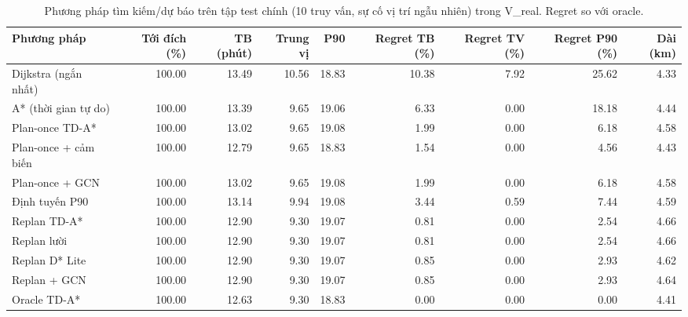 \begin{table}[!htbp]
\centering
\small
\caption{Phương pháp tìm kiếm/dự báo trên tập test chính (10 truy vấn, sự cố vị trí ngẫu nhiên) trong V\_real. Regret so với oracle.}
\label{tab:tab_main_classic}
\begin{adjustbox}{max width=\linewidth}
\begin{tabular}{lrrrrrrrr}
\toprule
Phương pháp & Tới đích (\%) & TB (phút) & Trung vị & P90 & Regret TB (\%) & Regret TV (\%) & Regret P90 (\%) & Dài (km) \\
\midrule
Dijkstra (ngắn nhất) & 100.00 & 13.49 & 10.56 & 18.83 & 10.38 & 7.92 & 25.62 & 4.33 \\
A* (thời gian tự do) & 100.00 & 13.39 & 9.65 & 19.06 & 6.33 & 0.00 & 18.18 & 4.44 \\
Plan-once TD-A* & 100.00 & 13.02 & 9.65 & 19.08 & 1.99 & 0.00 & 6.18 & 4.58 \\
Plan-once + cảm biến & 100.00 & 12.79 & 9.65 & 18.83 & 1.54 & 0.00 & 4.56 & 4.43 \\
Plan-once + GCN & 100.00 & 13.02 & 9.65 & 19.08 & 1.99 & 0.00 & 6.18 & 4.58 \\
Định tuyến P90 & 100.00 & 13.14 & 9.94 & 19.08 & 3.44 & 0.59 & 7.44 & 4.59 \\
Replan TD-A* & 100.00 & 12.90 & 9.30 & 19.07 & 0.81 & 0.00 & 2.54 & 4.66 \\
Replan lười & 100.00 & 12.90 & 9.30 & 19.07 & 0.81 & 0.00 & 2.54 & 4.66 \\
Replan D* Lite & 100.00 & 12.90 & 9.30 & 19.07 & 0.85 & 0.00 & 2.93 & 4.62 \\
Replan + GCN & 100.00 & 12.90 & 9.30 & 19.07 & 0.85 & 0.00 & 2.93 & 4.64 \\
Oracle TD-A* & 100.00 & 12.63 & 9.30 & 18.83 & 0.00 & 0.00 & 0.00 & 4.41 \\
\bottomrule
\end{tabular}
\end{adjustbox}
\end{table}
